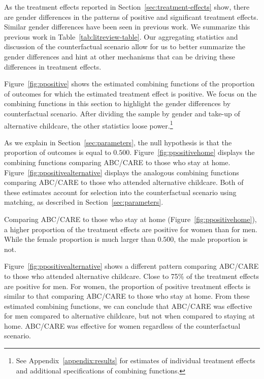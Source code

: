 
As the treatment effects reported in Section~\ref{sec:treatment-effects} show, there are gender differences in the patterns of positive and significant treatment effects. Similar gender differences have been seen in previous work. We summarize this previous work in Table~\ref{tab:litreview-table}. Our aggregating statistics and discussion of the counterfactual scenario allow for us to better summarize the gender differences and hint at other mechanisms that can be driving these differences in treatment effects.

Figure~\ref{fig:ppositive} shows the estimated combining functions of the proportion of outcomes for which the estimated treatment effect is positive. We focus on the combining functions in this section to highlight the gender differences by counterfactual scenario. After dividing the sample by gender and take-up of alternative childcare, the other statistics loose power.\footnote{See Appendix~\ref{appendix:results} for estimates of individual treatment effects and additional specifications of combining functions.} 

As we explain in Section~\ref{sec:parameters}, the null hypothesis is that the proportion of outcomes is equal to $0.500$. Figure~\ref{fig:ppositivehome} displays the combining functions comparing ABC/CARE to those who stay at home. Figure~\ref{fig:ppositivealternative} displays the analogous combining functions comparing ABC/CARE to those who attended alternative childcare. Both of these estimates account for selection into the counterfactual scenario using matching, as described in Section~\ref{sec:parameters}.

Comparing ABC/CARE to those who stay at home (Figure~\ref{fig:ppositivehome}), a higher proportion of the treatment effects are positive for women than for men. While the female proportion is much larger than $0.500$, the male proportion is not. 

Figure~\ref{fig:ppositivealternative} shows a different pattern comparing ABC/CARE to those who attended alternative childcare. Close to 75\% of the treatment effects are positive for men. For women, the proportion of positive treatment effects is similar to that comparing ABC/CARE to those who stay at home. From these estimated combining functions, we can conclude that ABC/CARE was effective for men compared to alternative childcare, but not when compared to staying at home. ABC/CARE was effective for women regardless of the counterfactual scenario. 

